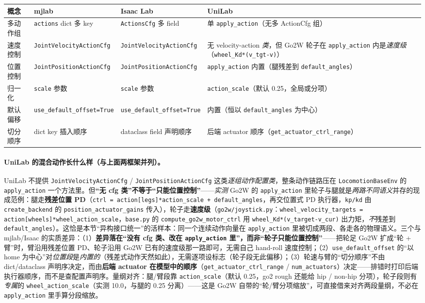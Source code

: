 \begin{center}
\small
\begin{tabular}{@{}llll@{}}
\toprule
概念 & mjlab & Isaac Lab & UniLab \\
\midrule
多动作组 & \verb|actions| dict 多 key & \verb|ActionsCfg| 多 field & 单 \verb|apply_action|（无多 ActionCfg 组） \\
速度控制 & \verb|JointVelocityActionCfg| & \verb|JointVelocityActionCfg| & 无 velocity-action \emph{类}，但 Go2W 轮子在 \verb|apply_action| 内是\emph{速度级}（\verb|wheel_Kd*(v_tgt-v)|） \\
位置控制 & \verb|JointPositionActionCfg| & \verb|JointPositionActionCfg| & \verb|apply_action| 内置（腿残差到 \verb|default_angles|） \\
归一化 & \verb|scale| 参数 & \verb|scale| 参数 & \verb|action_scale|（默认 0.25，全局或分项） \\
默认偏移 & \verb|use_default_offset=True| & \verb|use_default_offset=True| & 内置（恒以 \verb|default_angles| 为中心） \\
切分顺序 & dict key 插入顺序 & dataclass field 声明顺序 & 后端 actuator 顺序（\verb|get_actuator_ctrl_range|） \\
\bottomrule
\end{tabular}
\end{center}

\paragraph{UniLab 的混合动作长什么样（与上面两框架并列）。}UniLab 不提供 \verb|JointVelocityActionCfg| / \verb|JointPositionActionCfg| 这类\emph{逐组动作配置类}，整条动作链路压在 \verb|LocomotionBaseEnv| 的 \verb|apply_action| 一个方法里。但\textbf{“无 cfg 类”不等于“只能位置控制”}——\emph{实测} Go2W 的 \verb|apply_action| 里轮子与腿就是\emph{两路不同语义}并存的现成范例：腿走\textbf{残差位置 PD}（\verb|ctrl = action[legs]*action_scale + default_angles|，再交位置式 PD 执行器，\verb|kp/kd| 由 \verb|create_backend| 的 \verb|position_actuator_gains| 传入），轮子走\textbf{速度级}（\verb|go2w/joystick.py|：\verb|wheel_velocity_targets = action[wheels]*wheel_action_scale|，\verb|base.py| 的 \verb|compute_go2w_motor_ctrl| 用 \verb|wheel_Kd*(v_target-v_cur)| 出力矩，\emph{不}残差到 \verb|default_angles|）。这恰是本节“异构接口统一”的活样本：同一个连续动作向量在 \verb|apply_action| 里被切成两段、各走各的物理语义。三个与 mjlab/Isaac 的实质差异：（1）\textbf{差异落在“没有 cfg 类、改在 \texttt{apply\_action} 里”，而非“轮子只能位置控制”}——把轮足 Go2W 扩成“轮 + 臂”时，臂沿用残差位置 PD、轮子沿用 Go2W 已有的速度级那一路即可，无需自己 hand-roll 速度控制；（2）\verb|use_default_offset| 的“以 home 为中心”对\emph{位置段}是\emph{内置的}（残差式动作天然如此），无需逐项设标志（轮子段无此偏移）；（3）轮速与臂的“切分顺序”不由 dict/dataclass 声明序决定，而由\textbf{后端 actuator 在模型中的顺序}（\verb|get_actuator_ctrl_range| / \verb|num_actuators|）决定——排错时打印后端执行器顺序，而不是查配置声明序。量纲对齐：腿/臂段靠 \verb|action_scale|（默认 0.25，go2 rough 还能给 hip / non-hip 分项），轮子段则有\emph{专属}的 \verb|wheel_action_scale|（实测 10.0，与腿的 0.25 分离）——这是 Go2W 自带的“轮/臂分项缩放”，可直接借来对齐两段量纲，不必在 \verb|apply_action| 里手算分段缩放。


